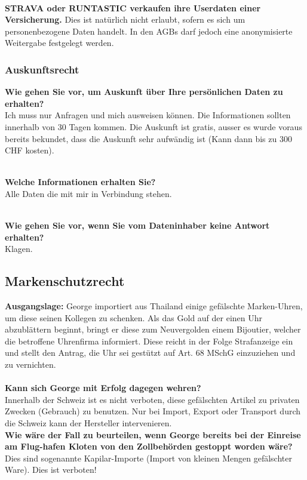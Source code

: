 \mbox{}\\
\textbf{STRAVA oder RUNTASTIC verkaufen ihre Userdaten einer
Versicherung.} Dies ist natürlich nicht erlaubt, sofern es sich um
personenbezogene Daten handelt. In den AGBs darf jedoch eine
anonymisierte Weitergabe festgelegt werden.

\subsubsection{Auskunftsrecht}

\textbf{Wie gehen Sie vor, um Auskunft über Ihre persönlichen Daten zu
erhalten?}\\
Ich muss nur Anfragen und mich ausweisen können. Die Informationen
sollten innerhalb von 30 Tagen kommen. Die Auskunft ist gratis, ausser
es wurde voraus bereits bekundet, dass die Auskunft sehr aufwändig ist
(Kann dann bis zu 300 CHF kosten).

\mbox{}\\
\textbf{Welche Informationen erhalten Sie?}\\
Alle Daten die mit mir in Verbindung stehen.

\mbox{}\\
\textbf{Wie gehen Sie vor, wenn Sie vom Dateninhaber keine Antwort
erhalten?}\\
Klagen.

\subsection{Markenschutzrecht}

\textbf{Ausgangslage:} George importiert aus Thailand einige gefälschte
Marken-Uhren, um diese seinen Kollegen zu schenken. Als das Gold auf der
einen Uhr abzublättern beginnt, bringt er diese zum Neuvergolden einem
Bijoutier, welcher die betroffene Uhrenfirma informiert. Diese reicht in
der Folge Strafanzeige ein und stellt den Antrag, die Uhr sei gestützt
auf Art. 68 MSchG einzuziehen und zu vernichten.\\
\\
\textbf{Kann sich George mit Erfolg dagegen wehren?}\\
Innerhalb der Schweiz ist es nicht verboten, diese gefälschten Artikel
zu privaten Zwecken (Gebrauch) zu benutzen. Nur bei Import, Export oder
Transport durch die Schweiz kann der Hersteller intervenieren.\\

\textbf{Wie wäre der Fall zu beurteilen, wenn George bereits bei der
Einreise am Flug-hafen Kloten von den Zollbehörden gestoppt worden
wäre?}\\
Dies sind sogenannte Kapilar-Importe (Import von kleinen Mengen
gefälschter Ware). Dies ist verboten!\\

